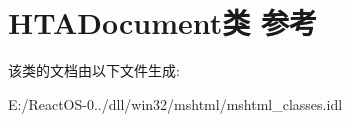 \hypertarget{class_h_t_a_document}{}\section{H\+T\+A\+Document类 参考}
\label{class_h_t_a_document}


该类的文档由以下文件生成\+:\begin{DoxyCompactItemize}
\item 
E\+:/\+React\+O\+S-\/0../dll/win32/mshtml/mshtml\+\_\+classes.\+idl\end{DoxyCompactItemize}
